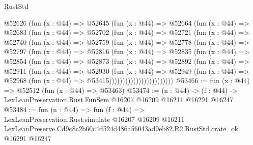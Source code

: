 \begin{lexlean}{RustStd}
\begin{coremodule}
            @52626
              (fun (x : @44) =>
              @52645
                (fun (x : @44) =>
                @52664
                  (fun (x : @44) =>
                  @52683
                    (fun (x : @44) =>
                    @52702
                      (fun (x : @44) =>
                      @52721
                        (fun (x : @44) =>
                        @52740
                          (fun (x : @44) =>
                          @52759
                            (fun (x : @44) =>
                            @52778
                              (fun (x : @44) =>
                              @52797
                                (fun (x : @44) =>
                                @52816
                                  (fun (x : @44) =>
                                  @52835
                                    (fun (x : @44) =>
                                    @52854
                                      (fun (x : @44) =>
                                      @52873
                                        (fun (x : @44) =>
                                        @52892
                                          (fun (x : @44) =>
                                          @52911
                                            (fun (x : @44) =>
                                            @52930
                                              (fun (x : @44) =>
                                              @52949
                                                (fun (x : @44) =>
                                                @52968
                                                  (fun (x : @44) => @53415))))))))))))))))))))))))
@53466 := fun (x : @44) => @52512 (fun (x : @44) => @53463)
@53474 := (n : @44) ->
  (f : @44) -> LexLeanPreservation.Rust.FunSem @16207 @16209 @16211 @16291 @16247
@53484 := fun (n : @44) =>
  fun (f : @44) =>
  LexLeanPreservation.Rust.simulate
    @16207
    @16209
    @16211
    LexLeanPreserve.Cd9c8c2b60c4d524d486a56043ad9eb82.R2.RustStd.crate_ok
    @16291
    @16247
\end{coremodule}
\end{lexlean}
